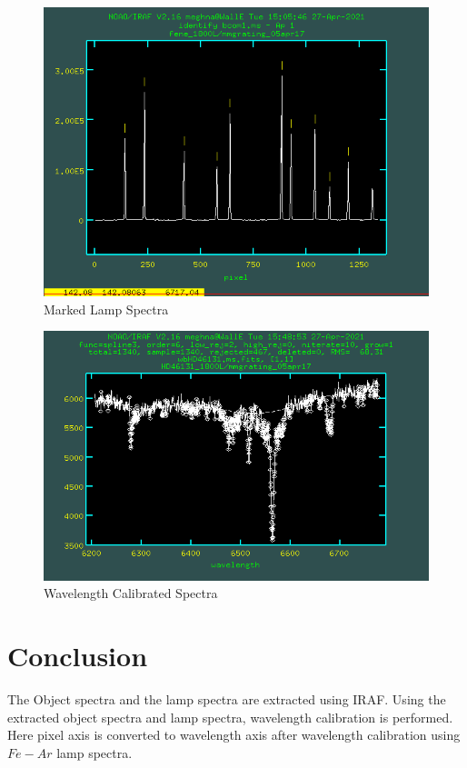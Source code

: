 \documentclass[letterpaper,11pt]{report}
\begin{document}
\begin{figure}[H]
    \centering
    \includegraphics[scale=0.4]{iraf/marked lampspectra.png}
    \caption{Marked Lamp Spectra}
    \label{fig:my_label}
\end{figure}

\begin{figure}[H]
    \centering
    \includegraphics[scale=0.4]{iraf/wavelength calibrated.png}
    \caption{Wavelength Calibrated Spectra}
    \label{fig:my_label}
\end{figure}

\section{Conclusion}
The Object spectra and the lamp spectra are extracted using IRAF. Using the extracted object spectra and lamp
spectra, wavelength calibration is performed. Here pixel axis is converted to wavelength axis after wavelength
calibration using $Fe-Ar$ lamp spectra.
\end{document}
